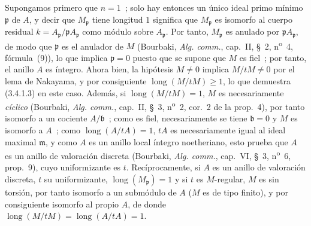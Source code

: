 Supongamos primero que $n=1$~; solo hay entonces un único ideal primo mínimo
$\mathfrak p$ de $A$,
y decir que $M_{\mathfrak p}$ tiene longitud $1$
significa que $M_{\mathfrak p}$ es isomorfo al cuerpo residual
$k=A_{\mathfrak p}/\mathfrak pA_{\mathfrak p}$ como
módulo sobre $A_{\mathfrak p}$. Por tanto, $M_{\mathfrak p}$ es anulado por
$\mathfrak pA_{\mathfrak p}$, de modo que $\mathfrak p$ es el anulador de $M$
(Bourbaki, \emph{Alg. comm.}, cap.~II, \S~2, n\textsuperscript{o}~4,
fórmula~(9)), lo que implica $\mathfrak p=0$ puesto que se supone que $M$ es fiel~;
por tanto, el anillo $A$ es íntegro. Ahora bien, la hipótesis $M\neq0$ implica
$M/tM\neq0$ por el lema de Nakayama, y por consiguiente
$\operatorname{long}(M/tM)\geqslant1$, lo que demuestra (3.4.1.3) en este caso.
Además, si $\operatorname{long}(M/tM)=1$, $M$ es necesariamente \emph{cíclico}
(Bourbaki, \emph{Alg. comm.}, cap.~II, \S~3, n\textsuperscript{o}~2, cor.~2
de la prop.~4), por tanto isomorfo a un cociente $A/\mathfrak b$~; como es
fiel, necesariamente se tiene $\mathfrak b=0$ y $M$ es isomorfo a $A$~;
como $\operatorname{long}(A/tA)=1$, $tA$ es necesariamente igual al ideal
maximal $\mathfrak m$, y como $A$ es un anillo local íntegro noetheriano,
esto prueba que $A$ es un anillo de valoración discreta (Bourbaki,
\emph{Alg. comm.}, cap.~VI, \S~3, n\textsuperscript{o}~6, prop.~9), cuyo uniformizante es $t$.
Recíprocamente, si $A$ es un anillo de valoración discreta, $t$ su
uniformizante, $\operatorname{long}(M_{\mathfrak p})=1$ y si $t$ es
$M$-regular, $M$ es sin torsión, por tanto isomorfo a un submódulo de $A$
($M$ es de tipo finito), y por consiguiente isomorfo al propio $A$, de donde
$\operatorname{long}(M/tM)=\operatorname{long}(A/tA)=1$.

